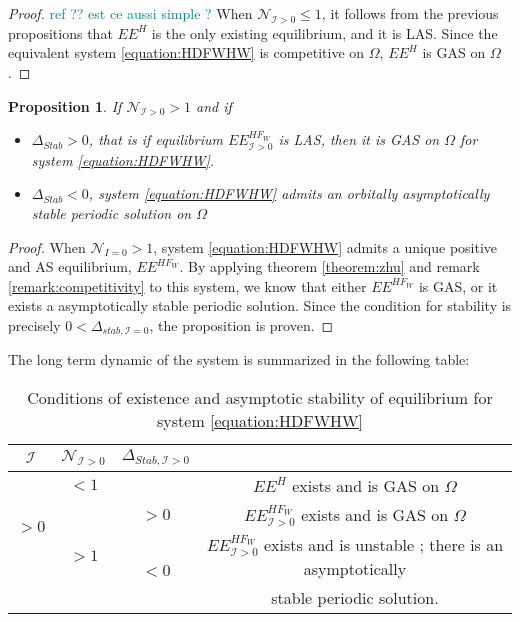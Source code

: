 \documentclass{article}
\newcommand{\cI}{\mathcal{I}}
\newcommand{\marc}[1]{\textcolor{teal}{#1}}
\newtheorem{prop}{Proposition}
\begin{document}
\begin{proof} \marc{ref ?? est ce aussi simple ?}
When $\mathcal{N}_{\cI > 0} \leq 1$, it follows from the previous propositions that $EE^{H}$ is the only existing equilibrium, and it is LAS. Since the equivalent system \eqref{equation:HDFWHW} is competitive on $\Omega$, $EE^{H}$ is GAS on $\Omega$.
\end{proof}


\begin{prop}
If $\mathcal{N}_{\cI > 0} > 1$ and if 

\begin{itemize}
\item $\Delta_{Stab} > 0$, that is if equilibrium $EE^{HF_W}_{\cI >0}$ is LAS, then it is GAS on $\Omega$ for system \eqref{equation:HDFWHW}.
\item $\Delta_{Stab} < 0$, system \eqref{equation:HDFWHW} admits an orbitally asymptotically stable periodic solution on $\Omega$
\end{itemize}
\end{prop}

\begin{proof}
When $\mathcal{N}_{I =0} > 1$, system \eqref{equation:HDFWHW} admits a unique positive and AS equilibrium, $EE^{HF_W}$. By applying theorem \ref{theorem:zhu} and remark \ref{remark:competitivity} to this system, we know that either $EE^{HF_W}$ is GAS, or it exists a asymptotically stable periodic solution. Since the condition for stability is precisely $0 < \Delta_{stab, \cI =0}$, the proposition is proven. 
\end{proof}


The long term dynamic of the system is summarized in the following table:
\begin{table}[!ht]
\def\arraystretch{2}
\centering
\begin{tabular}{c|c|c|c}
$\cI$ & $\mathcal{N}_{\cI > 0} $ & $\Delta_{Stab, \cI > 0}$ & \\
\hline
\multirow{3}{*}{$>0$} & $<1$ & &$EE^{H}$ exists and is GAS on $\Omega$ \\
\cline{2-4}
 & \multirow{3}{*}{$> 1$}  & $>0$ &$EE^{HF_W}_{\cI>0}$ exists and is GAS on $\Omega$ \\
 \cline{3-4}
 & & \multirow{2}{*}{$ < 0$} & $EE^{HF_W}_{\cI>0}$ exists and is unstable ; there is an asymptotically \\
 & & &  stable periodic solution. \\
\end{tabular}
\caption{\centering Conditions of existence and asymptotic stability of equilibrium for system \eqref{equation:HDFWHW}}
\end{table}
\end{document}
